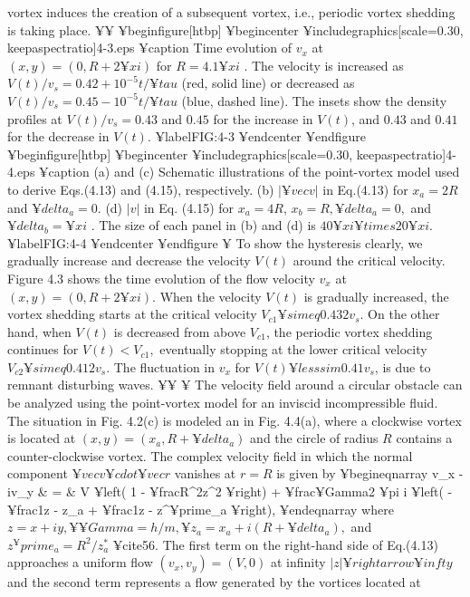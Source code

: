 {{{{{vortex induces the creation of a subsequent vortex, i.e.,
periodic vortex shedding is taking place.
¥¥
¥begin{figure}[htbp]
¥begin{center}
¥includegraphics[scale=0.30, keepaspectratio]{4-3.eps}
¥caption{
Time evolution of $v_x$ at $(x,y) = (0,R +
2 ¥xi)$ for $R = 4.1 ¥xi$ . The velocity is increased as $V(t)/v_s = 0.42 +
10^{-5}t/ ¥tau$ (red, solid line) or decreased as $V(t)/v_s = 0.45-10^{-5}t/¥tau$
(blue, dashed line). The insets show the density profiles at $V(t)/v_s =
0.43$ and $0.45$ for the increase in $V(t)$, and $0.43$ and $0.41$ for the
decrease in $V(t)$.
}
¥label{FIG:4-3}
¥end{center}
¥end{figure}
¥begin{figure}[htbp]
¥begin{center}
¥includegraphics[scale=0.30, keepaspectratio]{4-4.eps}
¥caption{
(a) and (c) Schematic illustrations of the point-vortex
model used to derive Eqs.(4.13) and (4.15), respectively. (b) $|¥vec{v}|$
in Eq.(4.13) for $x_a = 2R$ and $¥delta_a = 0$. (d) $|v|$ in Eq. (4.15) for $x_a = 4R$,
$x_b = R, ¥delta_a = 0,$ and $¥delta_b = ¥xi$ . The size of each panel in (b) and (d) is
$40 ¥xi ¥times 20 ¥xi$.
}
¥label{FIG:4-4}
¥end{center}
¥end{figure}
¥ To show the hysteresis clearly, we gradually increase
and decrease the velocity $V(t)$ around the critical
velocity. Figure 4.3 shows the time evolution of the flow 
velocity $v_x$ at $(x,y) = (0, R+2¥xi)$. When the velocity $V(t)$
is gradually increased, the vortex shedding starts at the critical
velocity $V_{c1} ¥simeq 0.432 v_s$. On the other hand, when $V(t)$
is decreased from above $V_{c1}$, the periodic vortex shedding
continues for $V(t) < V_{c1},$ eventually stopping at the
lower critical velocity $V_{c2} ¥simeq 0.412 v_s$. The fluctuation
in $v_x$ for $V(t) ¥lesssim 0.41 v_s$, is due to remnant disturbing
waves.
¥¥
¥ The velocity field around a circular obstacle can be
analyzed using the point-vortex model for an inviscid 
incompressible fluid. The situation in Fig. 4.2(c) is modeled
an in Fig. 4.4(a), where a clockwise vortex is located at
$(x,y)=(x_a, R+¥delta_a)$ and the circle of radius $R$
contains a counter-clockwise vortex. The complex velocity
field in which the normal component $¥vec{v} ¥cdot ¥vec{r}$
vanishes at $r = R$ is given by
¥begin{eqnarray}
v_x - iv_y & = &
V ¥left( 1 - ¥frac{R^2}{z^2} ¥right)
+ ¥frac{¥Gamma}{2 ¥pi i}
¥left( - ¥frac{1}{z - z_a} + ¥frac{1}{z - z^¥prime_a} ¥right),
¥end{eqnarray}
where $z = x + iy, ¥ ¥Gamma = h/m, ¥ z_a = x_a + i(R + ¥delta_a),$
and $z^¥prime_a = R^2/z^*_a$ ¥cite{56}.
The first term on the right-hand side of Eq.(4.13)
approaches a uniform flow $(v_x, v_y)=(V,0)$ at 
infinity $|z| ¥rightarrow ¥infty$ and the second term 
represents a flow generated by the vortices located at
}}}}}
